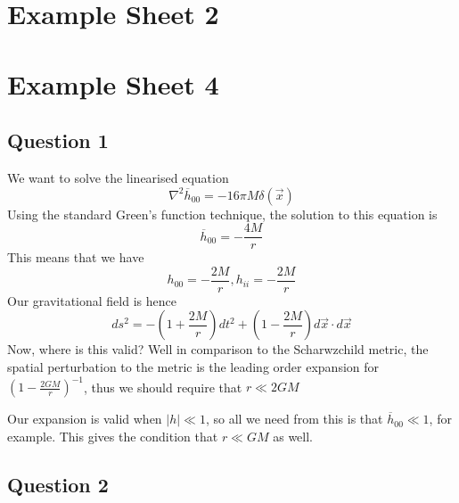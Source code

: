 \section{Example Sheet 2}

\pagebreak 

\section{Example Sheet 4}

\subsection{Question 1}
We want to solve the linearised 
equation 
\[
	\nabla ^ 2 \overline{ h } _{ 00 }  = - 16 \pi M \delta \left( \vec{x} \right) 
\] Using the standard 
Green's function technique, 
the solution to this equation is 
\[
 \overline{ h } _{ 00 }  = - \frac{4M}{ r} 
\] This means that we have
\[
	h_{ 00 }  =  - \frac{2M }{r}, h _{ ii }  =  - \frac{2M}{ r }
\] Our gravitational field is hence 
\[
	ds ^ 2  =  - \left( 1 + \frac{2M }{ r }  \right)  dt ^ 2 + \left( 1 - \frac{2M}{r }  \right)  
	d\vec{x} \cdot  d \vec{x} 
\] Now, where is this valid? 
Well in comparison to the Scharwzchild metric, 
the spatial perturbation to the metric is the leading order expansion for 
$ \left( 1   - \frac{2G M }{r}  \right)^{  - 1 } $, 
thus we should require that $ r \ll 2 G M $
 
Our expansion is valid when 
$ | h | \ll 1 $, so all we need from 
this is that $ \overline{ h } _{ 00 } \ll 1 $, 
for example. This gives the condition 
that $ r \ll GM $ as well. 
\subsection{Question 2} 


